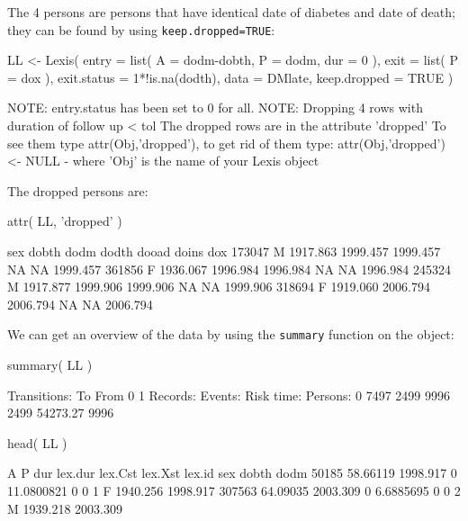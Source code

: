 \begin{enumerate}
  The 4 persons are persons that have identical date of diabetes and
  date of death; they can be found by using \texttt{keep.dropped=TRUE}:
\begin{Schunk}
\begin{Sinput}
 LL <- Lexis( entry = list( A = dodm-dobth,
                            P = dodm,
                          dur = 0 ),
               exit = list( P = dox ),
        exit.status = 1*!is.na(dodth),
               data = DMlate,
       keep.dropped = TRUE )
\end{Sinput}
\begin{Soutput}
NOTE: entry.status has been set to 0 for all.
NOTE: Dropping  4  rows with duration of follow up < tol
   The dropped rows are in the attribute 'dropped'
   To see them type attr(Obj,'dropped'),
   to get rid of them type: attr(Obj,'dropped') <- NULL
   - where 'Obj' is the name of your Lexis object
\end{Soutput}
\end{Schunk}
  The dropped persons are:
\begin{Schunk}
\begin{Sinput}
 attr( LL, 'dropped' )
\end{Sinput}
\begin{Soutput}
       sex    dobth     dodm    dodth dooad doins      dox
173047   M 1917.863 1999.457 1999.457    NA    NA 1999.457
361856   F 1936.067 1996.984 1996.984    NA    NA 1996.984
245324   M 1917.877 1999.906 1999.906    NA    NA 1999.906
318694   F 1919.060 2006.794 2006.794    NA    NA 2006.794
\end{Soutput}
\end{Schunk}
  We can get an overview of the data by using the \texttt{summary}
  function on the object:
\begin{Schunk}
\begin{Sinput}
 summary( LL )
\end{Sinput}
\begin{Soutput}
Transitions:
     To
From    0    1  Records:  Events: Risk time:  Persons:
   0 7497 2499      9996     2499   54273.27      9996
\end{Soutput}
\begin{Sinput}
 head( LL )
\end{Sinput}
\begin{Soutput}
              A        P dur    lex.dur lex.Cst lex.Xst lex.id sex    dobth     dodm
50185  58.66119 1998.917   0 11.0800821       0       0      1   F 1940.256 1998.917
307563 64.09035 2003.309   0  6.6885695       0       0      2   M 1939.218 2003.309

\end{Soutput}
\end{Schunk}
\end{enumerate}
